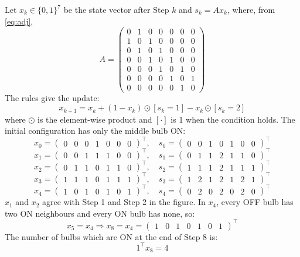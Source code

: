 \begin{enumerate}[label=\thesubsection.\arabic*, ref=\thesubsection.\theenumi, itemsep=0pt, leftmargin=*]
\solution Let $x_k \in \{0,1\}^7$ be the state vector after Step $k$ and $s_k = Ax_k$, where, from \eqref{eq:adj},
\[
A = \begin{pmatrix}
0 & 1 & 0 & 0 & 0 & 0 & 0 \\
1 & 0 & 1 & 0 & 0 & 0 & 0 \\
0 & 1 & 0 & 1 & 0 & 0 & 0 \\
0 & 0 & 1 & 0 & 1 & 0 & 0 \\
0 & 0 & 0 & 1 & 0 & 1 & 0 \\
0 & 0 & 0 & 0 & 1 & 0 & 1 \\
0 & 0 & 0 & 0 & 0 & 1 & 0
\end{pmatrix}
\]
The rules give the update:
\[
x_{k+1} = x_k + (1 - x_k) \odot [s_k = 1] - x_k \odot [s_k = 2]
\]
where $\odot$ is the element-wise product and $[\cdot]$ is 1 when the condition holds. The initial configuration has only the middle bulb ON:
\[
x_0 = \begin{pmatrix} 0 & 0 & 0 & 1 & 0 & 0 & 0 \end{pmatrix}^\top, \quad s_0 = \begin{pmatrix} 0 & 0 & 1 & 0 & 1 & 0 & 0 \end{pmatrix}^\top
\]
\[
x_1 = \begin{pmatrix} 0 & 0 & 1 & 1 & 1 & 0 & 0 \end{pmatrix}^\top, \quad s_1 = \begin{pmatrix} 0 & 1 & 1 & 2 & 1 & 1 & 0 \end{pmatrix}^\top
\]
\[
x_2 = \begin{pmatrix} 0 & 1 & 1 & 0 & 1 & 1 & 0 \end{pmatrix}^\top, \quad s_2 = \begin{pmatrix} 1 & 1 & 1 & 2 & 1 & 1 & 1 \end{pmatrix}^\top
\]
\[
x_3 = \begin{pmatrix} 1 & 1 & 1 & 0 & 1 & 1 & 1 \end{pmatrix}^\top, \quad s_3 = \begin{pmatrix} 1 & 2 & 1 & 2 & 1 & 2 & 1 \end{pmatrix}^\top
\]
\[
x_4 = \begin{pmatrix} 1 & 0 & 1 & 0 & 1 & 0 & 1 \end{pmatrix}^\top, \quad s_4 = \begin{pmatrix} 0 & 2 & 0 & 2 & 0 & 2 & 0 \end{pmatrix}^\top
\]
$x_1$ and $x_2$ agree with Step 1 and Step 2 in the figure. In $x_4$, every OFF bulb has two ON neighbours and every ON bulb has none, so:
\[
x_5 = x_4 \Rightarrow x_8 = x_4 = \begin{pmatrix} 1 & 0 & 1 & 0 & 1 & 0 & 1 \end{pmatrix}^\top
\]
The number of bulbs which are ON at the end of Step 8 is:
\[
1^\top x_8 = 4
\]


\end{enumerate}
